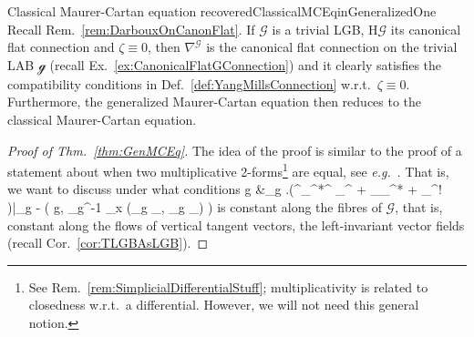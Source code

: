 \documentclass[a4paper,oneside,11pt,bibliography=totoc]{scrartcl}
\def\bas#1\eas{\begin{align*}#1\end{align*}}
\theoremstyle{plain}
\theoremstyle{remark}
\theoremstyle{definition}
\begin{document}
\begin{remarks}{Classical Maurer-Cartan equation recovered}{ClassicalMCEqinGeneralizedOne}
Recall Rem.\ \ref{rem:DarbouxOnCanonFlat}. If $\mathcal{G}$ is a trivial LGB, $\mathrm{H}\mathcal{G}$ its canonical flat connection and $\zeta \equiv 0$, then $\nabla^{\mathcal{G}}$ is the canonical flat connection on the trivial LAB $\mathcal{g}$ (recall Ex.\ \ref{ex:CanonicalFlatGConnection}) and it clearly satisfies the compatibility conditions in Def.\ \ref{def:YangMillsConnection} w.r.t.\ $\zeta \equiv 0$. Furthermore, the generalized Maurer-Cartan equation then reduces to the classical Maurer-Cartan equation.
\end{remarks}

\begin{proof}[Proof of Thm.\ \ref{thm:GenMCEq}]
\leavevmode\newline
The idea of the proof is similar to the proof of a statement about when two multiplicative 2-forms\footnote{See Rem.\ \ref{rem:SimplicialDifferentialStuff}; multiplicativity is related to closedness w.r.t.\ a differential. However, we will not need this general notion.} are equal, see \textit{e.g.}\ \cite[\S 3, Cor.\ 3.4]{bursztyn2004integration}. That is, we want to discuss under what conditions 
\bas
\mathcal{G} \ni g &\mapsto \omega_g \coloneqq
\mleft.\mleft(^{\pi_{}^*\nabla^{}} \mu_{}^{}
	+  _{\pi_{}^*}
	+ \pi_{}^! \zeta\mright)\mright|_g
	- \mleft( g, _{g^{-1}} \circ \zeta_x \circ \mleft(_g \pi_{}, _g \pi_{}\mright) \mright)
\eas
is constant along the fibres of $\mathcal{G}$, that is, constant along the flows of vertical tangent vectors, the left-invariant vector fields (recall Cor.\ \ref{cor:TLGBAsLGB}). 


\end{proof}
\end{document}
